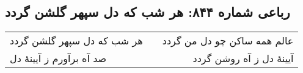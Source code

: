 \begin{center}
\section*{رباعی شماره ۸۴۴: هر شب که دل سپهر گلشن گردد}
\label{sec:0844}
\begin{longtable}{l p{0.5cm} r}
هر شب که دل سپهر گلشن گردد
&&
عالم همه ساکن چو دل من گردد
\\
صد آه برآورم ز آیینهٔ دل
&&
آیینهٔ دل ز آه روشن گردد
\\
\end{longtable}
\end{center}
